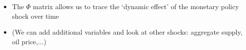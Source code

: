 \documentclass[10pt,english,t,aspectratio=169,ignorenonframetext]{beamer}
\DeclareRobustCommand{\augiefamily}{%
  \fontfamily{augie}\fontseries{b}\fontshape{n}\selectfont}
\begin{document}
\begin{frame}
\begin{itemize}
\begin{itemize}
\item The $\Phi $ matrix allows us to trace the `dynamic effect' of the
monetary policy shock over time\medskip 
{}
\pause

\item (We can add additional variables and look at other shocks: aggregate
supply, oil price,...)
\end{itemize}
\end{itemize}
\end{frame}

\end{document}
